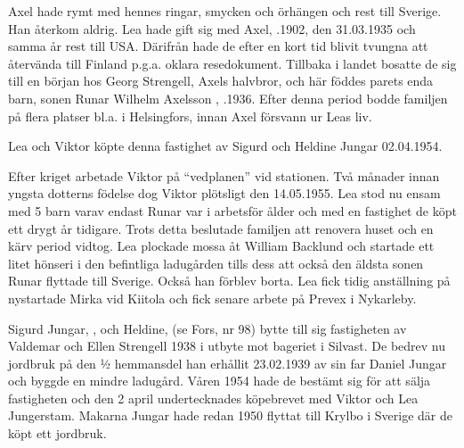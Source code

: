 Axel hade rymt med hennes ringar, smycken och örhängen och rest till Sverige. Han återkom aldrig. Lea hade gift sig med Axel, .1902, den 31.03.1935 och samma år rest till USA. Därifrån hade de efter en kort tid blivit tvungna att återvända till Finland p.g.a. oklara resedokument. Tillbaka i landet bosatte de sig till en början hos Georg Strengell, Axels halvbror, och här föddes parets enda barn, sonen Runar Wilhelm Axelsson , .1936. Efter denna period bodde familjen på flera platser bl.a. i Helsingfors, innan Axel försvann ur Leas liv.

Lea och Viktor köpte denna fastighet av Sigurd och Heldine Jungar 02.04.1954.
\begin{jhchildren}
  \item {}
  \item {}
  \item {}
  \item {}
\end{jhchildren}

Efter kriget arbetade Viktor på ``vedplanen'' vid stationen. Två månader innan yngsta dotterns födelse dog Viktor plötsligt den 14.05.1955. Lea stod nu ensam med 5 barn varav endast Runar var i arbetsför ålder och med en fastighet de köpt ett drygt år tidigare. Trots detta beslutade familjen att renovera huset och en kärv period vidtog. Lea plockade mossa åt William Backlund och startade ett litet hönseri i den befintliga ladugården tills dess att också den äldsta sonen Runar flyttade till Sverige. Också han förblev borta. Lea fick tidig anställning på nystartade Mirka vid Kiitola och fick senare arbete på Prevex i Nykarleby.


%
Sigurd Jungar, , och Heldine,  (se Fors, nr 98) bytte till sig fastigheten av Valdemar och Ellen Strengell 1938 i utbyte mot bageriet i Silvast. De bedrev nu jordbruk på den ½ hemmansdel han erhållit 23.02.1939 av sin far Daniel Jungar och byggde en mindre ladugård. Våren 1954 hade de bestämt sig för att sälja fastigheten och den 2 april undertecknades köpebrevet med Viktor och Lea Jungerstam. Makarna Jungar hade redan 1950 flyttat till Krylbo i Sverige där de köpt ett jordbruk.


